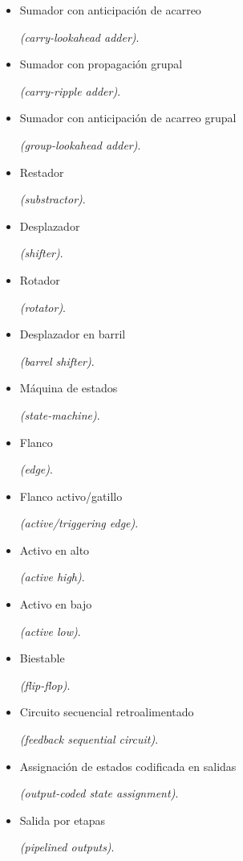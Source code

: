 \begin{itemize}
    \item \hypertarget{carry-lookahead_adder}{Sumador con anticipación de acarreo} \emph{(carry-lookahead adder)}.
    \item \hypertarget{group-ripple_adder}{Sumador con propagación grupal} \emph{(carry-ripple adder)}.
    \item \hypertarget{group-lookahead_adder}{Sumador con anticipación de acarreo grupal} \emph{(group-lookahead adder)}.
    \item \hypertarget{substractor}{Restador} \emph{(substractor)}.
    \item \hypertarget{shifter}{Desplazador} \emph{(shifter)}.
    \item \hypertarget{rotator}{Rotador} \emph{(rotator)}.
    \item \hypertarget{barrel_shifter}{Desplazador en barril} \emph{(barrel shifter)}.
    \item \hypertarget{state_machine}{Máquina de estados} \emph{(state-machine)}.
    \item \hypertarget{edge}{Flanco} \emph{(edge)}.
    \item \hypertarget{active_edge}{Flanco activo/gatillo} \emph{(active/triggering edge)}.
    \item \hypertarget{active_high}{Activo en alto} \emph{(active high)}.
    \item \hypertarget{active_low}{Activo en bajo} \emph{(active low)}.
    \item \hypertarget{flip-flop}{Biestable} \emph{(flip-flop)}.
    \item \hypertarget{feedback_sequential_circuit}{Circuito secuencial retroalimentado} \emph{(feedback sequential circuit)}.
    \item \hypertarget{output-coded_state_assignment}{Assignación de estados codificada en salidas} \emph{(output-coded state assignment)}.
    \item \hypertarget{pipelined_outputs}{Salida por etapas} \emph{(pipelined outputs)}.
\end{itemize}